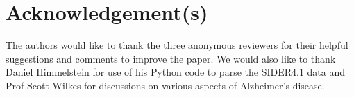 \documentclass[preprint,11pt]{elsarticle}
\begin{document}
\section*{Acknowledgement(s)}
The authors would like to thank the three anonymous reviewers for their helpful suggestions and comments to improve the paper. We would also like to thank Daniel Himmelstein for use of his Python code to parse the SIDER4.1 data and Prof Scott Wilkes for discussions on various aspects of Alzheimer's disease.



\end{document}
